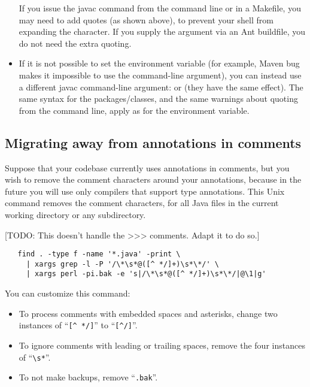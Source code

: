 \begin{itemize}
If you issue the javac command from the command line or in a Makefile, you
may need to add quotes (as shown above), to prevent your shell from
expanding the \code{*} character.
If you supply the  argument via an Ant buildfile,
you do not need the extra quoting.

\item
If it is not possible to set the environment variable (for example, Maven
bug 
makes it impossible to use the  command-line
argument), you can instead use a different javac command-line argument:
 or  (they have the
same effect).  The same syntax for the packages/classes, and the same
warnings about quoting from the command line, apply as for the
 environment variable.

\end{itemize}



\subsection{Migrating away from annotations in comments\label{uncommenting-annotations}}

Suppose that your codebase currently uses annotations in comments, but you
wish to remove the comment characters around your annotations, because in
the future you will use only compilers that support type annotations.
This Unix command removes
the comment characters, for all Java files in the current
working directory or any subdirectory.

[TODO: This doesn't handle the >>> comments.  Adapt it to do so.]

\begin{Verbatim}
   find . -type f -name '*.java' -print \
     | xargs grep -l -P '/\*\s*@([^ */]+)\s*\*/' \
     | xargs perl -pi.bak -e 's|/\*\s*@([^ */]+)\s*\*/|@\1|g'
\end{Verbatim}

You can customize this command:
\begin{itemize}
\item
To process comments with embedded spaces and asterisks, change
two instances of ``\verb|[^ */]|'' to ``\verb|[^/]|''.
\item
To ignore comments with leading or trailing spaces, remove the four
instances of ``\verb|\s*|''.
\item
  To not make backups, remove ``\verb|.bak|''.
\end{itemize}


